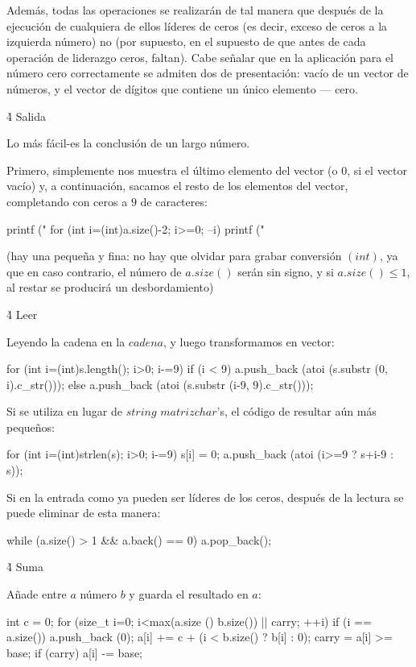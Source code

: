 Además, todas las operaciones se realizarán de tal manera que después de la ejecución de cualquiera de ellos líderes de ceros (es decir, exceso de ceros a la izquierda número) no (por supuesto, en el supuesto de que antes de cada operación de liderazgo ceros, faltan). Cabe señalar que en la aplicación para el número cero correctamente se admiten dos de presentación: vacío de un vector de números, y el vector de dígitos que contiene un único elemento --- cero.


\h4{ Salida }

Lo más fácil-es la conclusión de un largo número.

Primero, simplemente nos muestra el último elemento del vector (o $0$, si el vector vacío) y, a continuación, sacamos el resto de los elementos del vector, completando con ceros a $9$ de caracteres:

\code
printf ("%
for (int i=(int)a.size()-2; i>=0; --i)
printf ("%
\endcode

(hay una pequeña y fina: no hay que olvidar para grabar conversión $(int)$, ya que en caso contrario, el número de $a.size()$ serán sin signo, y si $a.size() \le 1$, al restar se producirá un desbordamiento)


\h4{ Leer }

Leyendo la cadena en la $cadena$, y luego transformamos en vector:

\code
for (int i=(int)s.length(); i>0; i-=9)
if (i < 9)
a.push_back (atoi (s.substr (0, i).c_str()));
else
a.push_back (atoi (s.substr (i-9, 9).c_str()));
\endcode

Si se utiliza en lugar de $string$ $matriz char$'s, el código de resultar aún más pequeños:

\code
for (int i=(int)strlen(s); i>0; i-=9) {
s[i] = 0;
a.push_back (atoi (i>=9 ? s+i-9 : s));
}
\endcode

Si en la entrada como ya pueden ser líderes de los ceros, después de la lectura se puede eliminar de esta manera:

\code
while (a.size() > 1 && a.back() == 0)
a.pop_back();
\endcode


\h4{ Suma }

Añade entre $a$ número $b$ y guarda el resultado en $a$:

\code
int c = 0;
for (size_t i=0; i<max(a.size () b.size()) || carry; ++i) {
if (i == a.size())
a.push_back (0);
a[i] += c + (i < b.size() ? b[i] : 0);
carry = a[i] >= base;
if (carry) a[i] -= base;
}
\endcode


